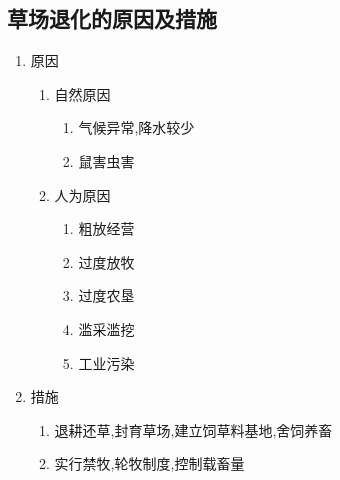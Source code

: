 \documentclass[a4paper]{article}
\begin{document}
    \subsection{草场退化的原因及措施}
    \begin{enumerate}
        \item 原因
        \begin{enumerate}
            \item 自然原因
            \begin{enumerate}
                \item 气候异常,降水较少
                \item 鼠害虫害
            \end{enumerate}
            \item 人为原因
            \begin{enumerate}
                \item 粗放经营
                \item 过度放牧
                \item 过度农垦
                \item 滥采滥挖
                \item 工业污染
            \end{enumerate}
        \end{enumerate}
        \item 措施
        \begin{enumerate}
            \item 退耕还草,封育草场,建立饲草料基地,舍饲养畜
            \item 实行禁牧,轮牧制度,控制载畜量
        \end{enumerate}
    \end{enumerate}
\end{document}
